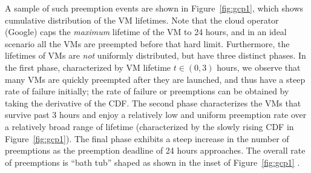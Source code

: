 A sample of  such preemption events are shown in Figure~\ref{fig:gcp1}, which shows cumulative distribution of the VM lifetimes. 
Note that the cloud operator (Google) caps the \emph{maximum} lifetime of the VM to 24 hours, and in an ideal scenario all the VMs are preempted before that hard limit. 
Furthermore, the lifetimes of VMs are \emph{not} uniformly distributed, but have three distinct phases. 
In the first phase, characterized by VM lifetime $t\in (0,3)$ hours, we observe that many VMs are quickly preempted after they are launched, and thus have a steep rate of failure initially; the rate of failure or preemptions can be obtained by taking the derivative of the CDF. The second phase characterizes the VMs that survive past 3 hours and enjoy a relatively low and uniform preemption rate over a relatively broad range of lifetime (characterized by the slowly rising CDF in Figure~\ref{fig:gcp1}). The final phase exhibits a steep increase in the number of preemptions as the preemption deadline of 24 hours approaches. The overall rate of preemptions is ``bath tub'' shaped as shown in the inset of Figure~\ref{fig:gcp1} .


